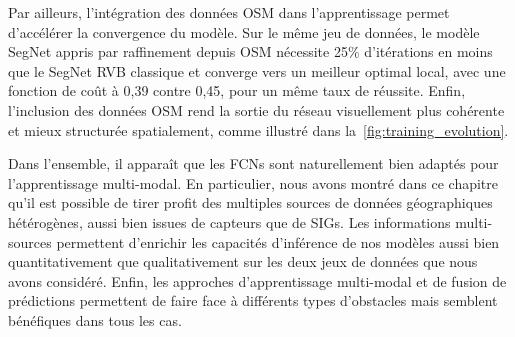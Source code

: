 Par ailleurs, l'intégration des données OSM dans l'apprentissage permet d'accélérer la convergence du modèle. Sur le même jeu de données, le modèle SegNet appris par raffinement depuis OSM nécessite 25\% d'itérations en moins que le SegNet RVB classique et converge vers un meilleur optimal local, avec une fonction de coût à 0,39 contre 0,45, pour un même taux de réussite. Enfin, l'inclusion des données OSM rend la sortie du réseau visuellement plus cohérente et mieux structurée spatialement, comme illustré dans la~\cref{fig:training_evolution}.

Dans l'ensemble, il apparaît que les \glspl{FCN} sont naturellement bien adaptés pour l'apprentissage multi-modal. En particulier, nous avons montré dans ce chapitre qu'il est possible de tirer profit des multiples sources de données géographiques hétérogènes, aussi bien issues de capteurs que de \glspl{SIG}. Les informations multi-sources permettent d'enrichir les capacités d'inférence de nos modèles aussi bien quantitativement que qualitativement sur les deux jeux de données que nous avons considéré. Enfin, les approches d'apprentissage multi-modal et de fusion de prédictions permettent de faire face à différents types d'obstacles mais semblent bénéfiques dans tous les cas.
%
%
\printbibliography
